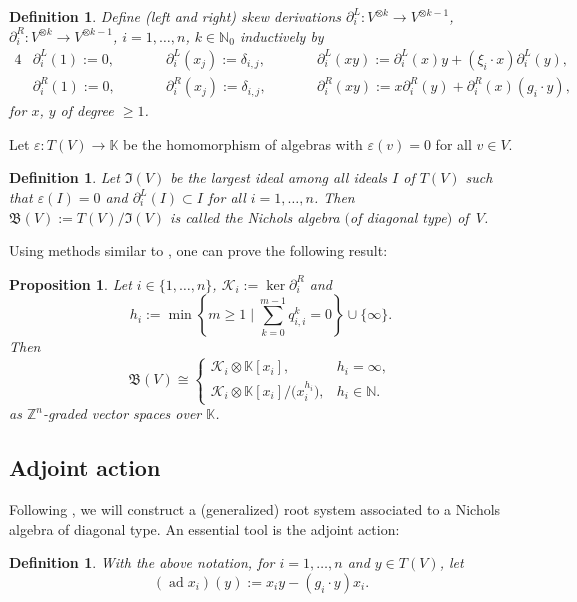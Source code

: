 \documentclass[pdftex]{sigma}
\numberwithin{equation}{section}
\newtheorem{Proposition}[Theorem]{Proposition}
\newtheorem{Definition}[Theorem]{Definition}
\newcommand{\NN }{\mathbb{N}}
\newcommand{\ZZ }{\mathbb{Z}}
\newcommand{\KK }{\mathbb{K}}
\newcommand{\del }{\partial^L}
\newcommand{\der }{\partial^R}
\newcommand{\BB }{\mathfrak{B}}
\newcommand{\II }{\mathfrak{I}}
\newcommand{\Kc }{\mathcal{K}}
\DeclareMathOperator{\ad}{ad}
\begin{document}
\begin{Definition}
Define (left and right) {\it skew derivations}
$\del_i \colon V^{\otimes k}\rightarrow V^{\otimes k-1}$,
$\der_i \colon V^{\otimes k}\rightarrow V^{\otimes k-1}$,
$i=1,\dots,n$, $k\in\NN_0$ inductively by
\begin{alignat*}{4}
& \del_i(1):=0, \qquad &&\del_i(x_j):=\delta_{i,j}, \qquad&&
\del_i(xy):=\del_i(x)y + (\xi_i\cdot x) \del_i(y),&\\
& \der_i(1):=0, \qquad &&\der_i(x_j):=\delta_{i,j}, \qquad&&
\der_i(xy):=x\der_i(y) + \der_i(x) (g_i \cdot y),&
\end{alignat*}
for $x$, $y$ of degree $\ge 1$.
\end{Definition}

Let $\varepsilon \colon T(V) \rightarrow \KK$ be the homomorphism of algebras with $\varepsilon(v)=0$ for all $v\in V$.

\begin{Definition}
Let $\II(V)$ be the largest ideal among all ideals $I$ of $T(V)$ such that $\varepsilon(I)=0$ and
$\del_i(I)\subset I$ for all $i=1,\dots,n$.
Then $\BB(V):=T(V)/\II(V)$ is called the {\it Nichols algebra $($of diagonal type$)$} of~$V$.
\end{Definition}

Using methods similar to \cite[Lemma~2.2]{p-J-77}, one can prove the following result:

\begin{Proposition}
Let $i\in\{1,\dots,n\}$, $\Kc_i:=\ker \der_i$ and
\[ h_i := \min\left\{ m\ge 1 \mid \sum_{k=0}^{m-1} q_{i,i}^k =0\right\} \cup \{\infty\}. \]
Then
\[ \BB(V) \cong \begin{cases}
\Kc_i\otimes \KK[x_i], & h_i = \infty, \\
\Kc_i\otimes \KK[x_i]/\big(x_i^{h_i}\big), & h_i \in \NN.
\end{cases} \]
as $\ZZ^n$-graded vector spaces over $\KK$.
\end{Proposition}

\subsection{Adjoint action}

Following \cite{p-H-06}, we will construct a (generalized) root system associated to a Nichols algebra of diagonal type.
An essential tool is the adjoint action:

\begin{Definition}With the above notation, for $i=1,\dots,n$ and $y\in T(V)$, let
\[ (\ad x_i)(y) := x_i y - (g_i\cdot y) x_i. \]
\end{Definition}
\end{document}
